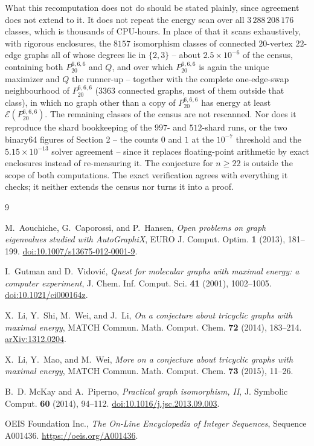 \documentclass[11pt]{amsart}
\newcommand{\energy}{\mathcal E}
\newcommand{\target}{P_{20}^{6,6,6}}
\begin{document}
What this recomputation does not do should be stated plainly, since
agreement does not extend to it. It does not repeat the energy scan over all
$3\,288\,208\,176$ classes, which is thousands of CPU-hours. In place
of that it scans exhaustively, with rigorous enclosures, the $8157$
isomorphism classes of connected $20$-vertex $22$-edge graphs all of
whose degrees lie in $\{2,3\}$ -- about $2.5\times10^{-6}$ of the
census, containing both $\target$ and $Q$, and over which $\target$ is
again the unique maximizer and $Q$ the runner-up -- together with the
complete one-edge-swap neighbourhood of $\target$ ($3363$ connected
graphs, most of them outside that class), in which no graph other than
a copy of $\target$ has energy at least $\energy(\target)$. The
remaining classes of the census are not rescanned. Nor does it
reproduce the shard bookkeeping of the $997$- and $512$-shard runs, or
the two binary64 figures of Section 2 -- the counts $0$ and $1$ at the
$10^{-7}$ threshold and the $5.15\times10^{-13}$ solver agreement --
since it replaces floating-point arithmetic by exact enclosures instead
of re-measuring it. The conjecture for $n\ge22$ is outside the scope of
both computations. The exact verification agrees with everything it
checks; it neither extends the census nor turns it into a proof.

\begin{thebibliography}{9}

M.~Aouchiche, G.~Caporossi, and P.~Hansen,
\emph{Open problems on graph eigenvalues studied with AutoGraphiX},
EURO J. Comput. Optim. \textbf{1} (2013), 181--199.
\href{https://doi.org/10.1007/s13675-012-0001-9}
{doi:10.1007/s13675-012-0001-9}.

I.~Gutman and D.~Vidovi\'c,
\emph{Quest for molecular graphs with maximal energy: a computer
experiment},
J. Chem. Inf. Comput. Sci. \textbf{41} (2001), 1002--1005.
\href{https://doi.org/10.1021/ci000164z}
{doi:10.1021/ci000164z}.

X.~Li, Y.~Shi, M.~Wei, and J.~Li,
\emph{On a conjecture about tricyclic graphs with maximal energy},
MATCH Commun. Math. Comput. Chem. \textbf{72} (2014), 183--214.
\href{https://arxiv.org/abs/1312.0204}{arXiv:1312.0204}.

X.~Li, Y.~Mao, and M.~Wei,
\emph{More on a conjecture about tricyclic graphs with maximal energy},
MATCH Commun. Math. Comput. Chem. \textbf{73} (2015), 11--26.

B.~D. McKay and A.~Piperno,
\emph{Practical graph isomorphism, II},
J. Symbolic Comput. \textbf{60} (2014), 94--112.
\href{https://doi.org/10.1016/j.jsc.2013.09.003}
{doi:10.1016/j.jsc.2013.09.003}.

OEIS Foundation Inc.,
\emph{The On-Line Encyclopedia of Integer Sequences},
Sequence A001436.
\url{https://oeis.org/A001436}.

\end{thebibliography}
\end{document}
